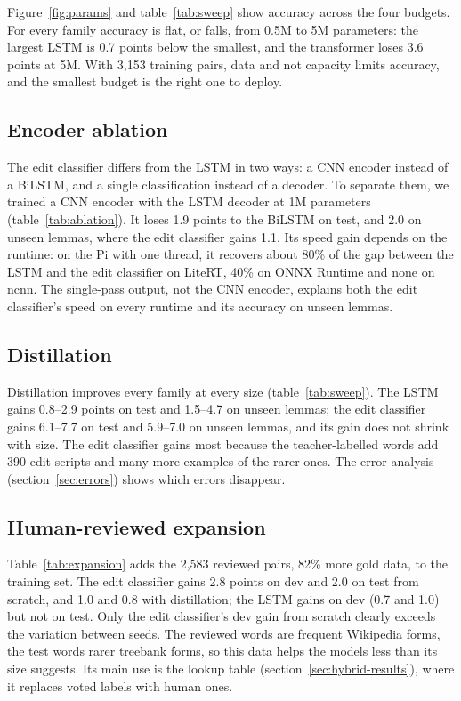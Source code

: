 \documentclass{sadhana}
\begin{document}
Figure~\ref{fig:params} and table~\ref{tab:sweep} show accuracy across the four
budgets. For every family accuracy is flat, or falls, from 0.5M to 5M
parameters: the largest LSTM is 0.7 points below the smallest, and the
transformer loses 3.6 points at 5M. With 3,153 training pairs, data and not
capacity limits accuracy, and the smallest budget is the right one to deploy.



\subsection{Encoder ablation}

The edit classifier differs from the LSTM in two ways: a CNN encoder instead of
a BiLSTM, and a single classification instead of a decoder. To separate them,
we trained a CNN encoder with the LSTM decoder at 1M parameters
(table~\ref{tab:ablation}). It loses 1.9 points to the BiLSTM on test, and 2.0
on unseen lemmas, where the edit classifier gains 1.1. Its speed gain depends
on the runtime: on the Pi with one thread, it recovers about 80\% of the gap
between the LSTM and the edit classifier on LiteRT, 40\% on ONNX Runtime and
none on ncnn. The single-pass output, not the CNN encoder, explains both the
edit classifier's speed on every runtime and its accuracy on unseen lemmas.

\subsection{Distillation}

Distillation improves every family at every size (table~\ref{tab:sweep}). The
LSTM gains 0.8--2.9 points on test and 1.5--4.7 on unseen lemmas; the edit
classifier gains 6.1--7.7 on test and 5.9--7.0 on unseen lemmas, and its gain
does not shrink with size. The edit classifier gains most because the
teacher-labelled words add 390 edit scripts and many more examples of the
rarer ones. The error analysis (section~\ref{sec:errors}) shows which errors
disappear.



\subsection{Human-reviewed expansion}

Table~\ref{tab:expansion} adds the 2,583 reviewed pairs, 82\% more gold data,
to the training set. The edit classifier gains 2.8 points on dev and 2.0 on
test from scratch, and 1.0 and 0.8 with distillation; the LSTM gains on dev
(0.7 and 1.0) but not on test. Only the edit classifier's dev gain from
scratch clearly exceeds the variation between seeds. The reviewed words are
frequent Wikipedia forms, the test words rarer treebank forms, so this data
helps the models less than its size suggests. Its main use is the lookup table
(section~\ref{sec:hybrid-results}), where it replaces voted labels with human
ones.
\end{document}

